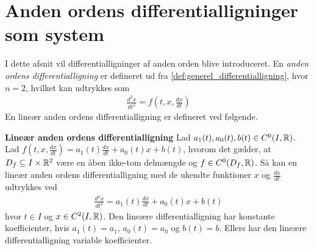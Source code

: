 \section{Anden ordens differentialligninger som system}

I dette afsnit vil differentialligninger af anden orden blive introduceret. En \textit{anden ordens differentialligning} er defineret ud fra \autoref{def:generel_differentialligning}, hvor $n=2$, hvilket kan udtrykkes som
\begin{align*}
    \frac{d^2x}{dt^2} = f\left(t, x, \frac{dx}{dt}\right)
\end{align*}
En lineær anden ordens differentialligning er defineret ved følgende. 
\begin{defn}\textbf{Lineær anden ordens differentialligning} %
\newline
Lad $a_1(t),a_0(t), b(t) \in C^0(I,\mathbb{R})$. Lad $f(t,x, \frac{dx}{dt})=a_1(t)\frac{dx}{dt}+a_0(t)x + b(t)$, hvorom det gælder, at $D_f\subseteq I \times \mathbb{R}^2$ være en åben ikke-tom delmængde og $f\in C^0(D_f,\mathbb{R})$. Så kan en lineær anden ordens differentialligning med de ukendte funktioner $x$ og $\frac{dx}{dt}$ udtrykkes ved
\begin{align*}
    \frac{d^2x}{dt^2}=a_1(t)\frac{dx}{dt}+a_0(t)x + b(t)
\end{align*}
hvor $t \in I$ og $x \in C^2(I, \mathbb{R})$. Den lineære differentialligning har konstante koefficienter, hvis $a_1(t)=a_1$, $a_0(t)=a_0$ og $b(t)=b$. Ellers har den lineære differentialligning variable koefficienter.
\end{defn}



